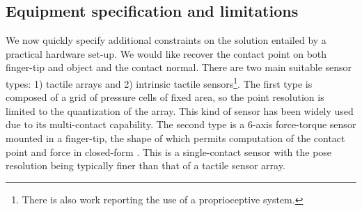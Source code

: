 


\subsection{Equipment specification and limitations}
\label{sec:limitations}

We now quickly specify additional constraints on the solution entailed by a practical hardware set-up. We would like recover the contact point on both finger-tip and object and the contact normal. There are two main suitable sensor types: 1) tactile arrays and 2) intrinsic tactile sensors\footnote{There is also work reporting the use of a proprioceptive system.}. The first type is composed of a grid of pressure cells of fixed area, so the point resolution is limited to the quantization of the array. This kind of sensor has been widely used due to its multi-contact capability. %
The second type is a $6$-axis force-torque sensor mounted in a finger-tip, the shape of which permits computation of the contact point and force in closed-form \cite{Bicchi1993Contact}. This is a single-contact sensor with the pose resolution being typically finer than that of a tactile sensor array.

